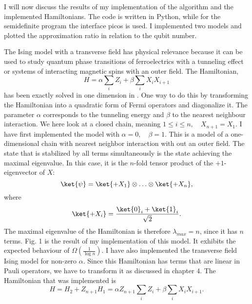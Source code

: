I will now discuss the results of my implementation of the algorithm and the implemented Hamiltonians.
The code is written in Python, while for the semidefinite program the interface picos is used.
I implemented two models and plotted the approximation ratio in relation to the qubit number.

The Ising model with a transverse field has physical relevance because it can be used to study quantum phase transitions of ferroelectrics with a tunneling effect or systems of interacting magnetic spins with an outer field.
The Hamiltonian,
\[
H=\alpha \sum_{i} Z_i + \beta \sum_{i} X_iX_{i+1}
\]
has been exactly solved in one dimension in \cite{pfeuty70}.
One way to do this by transforming the Hamiltonian into a quadratic form of Fermi operators and diagonalize it. 
The parameter $\alpha$ corresponds to the tunneling energy and $\beta$ to the nearest neighbour interaction.
We here look at a closed chain, meaning $1\le i \le n, \quad X_{n+1}=X_{1}$.
I have first implemented the model with $\alpha =0, \quad \beta =1$.
This is a model of a one-dimensional chain with nearest neighbor interaction with out an outer field.
The state that is stabilized by all terms simultaneously is the state achieving the maximal eigenvalue.
In this case, it is the $n$-fold tensor product of the $+1$-eigenvector of $X$: \[
\ket{\psi}= \ket{+X_1}\otimes\ldots\otimes\ket{+X_n}
,\] where \[
\ket{+X_i}= \frac{\ket{0}_i+\ket{1}_i}{\sqrt{2}}
.\]
The maximal eigenvalue of the Hamiltonian is therefore $\lambda_{max}=n$, since it has $n$ terms.
Fig. 1 is the result of my implementation of this model.
It exhibits the expected behaviour of $\Omega(\frac{1}{\log{}n})$.
I have also implemented the transverse field Ising model for non-zero $\alpha$.
Since this Hamiltonian has terms that are linear in Pauli operators, we have to transform it as discussed in chapter 4.
The Hamiltonian that was implemented is \[
H = H_2 + Z_{n+1}H_1 =\alpha Z_{n+1}\sum_{i} Z_i + \beta \sum_{i} X_iX_{i+1}
.\]

